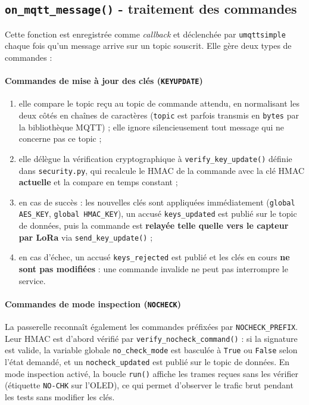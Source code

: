 \documentclass[a4paper,11pt]{report}
\begin{document}
\subsection{\texttt{on\_mqtt\_message()} - traitement des commandes}
Cette fonction est enregistrée comme \emph{callback} et déclenchée par \texttt{umqttsimple} chaque fois
qu'un message arrive sur un topic souscrit. Elle gère deux types de commandes :

\paragraph{Commandes de mise à jour des clés (\texttt{KEYUPDATE})}
\begin{enumerate}
    \item elle compare le topic reçu au topic de commande attendu, en normalisant les deux côtés en
    chaînes de caractères (\texttt{topic} est parfois transmis en \texttt{bytes} par la bibliothèque MQTT) ;
    elle ignore silencieusement tout message qui ne concerne pas ce topic ;
    \item elle délègue la vérification cryptographique à \texttt{verify\_key\_update()} définie dans
    \texttt{security.py}, qui recalcule le HMAC de la commande avec la clé HMAC \textbf{actuelle} et la
    compare en temps constant ;
    \item en cas de succès : les nouvelles clés sont appliquées immédiatement (\texttt{global AES\_KEY},
    \texttt{global HMAC\_KEY}), un accusé \texttt{keys\_updated} est publié sur le topic de données, puis
    la commande est \textbf{relayée telle quelle vers le capteur par LoRa} via \texttt{send\_key\_update()} ;
    \item en cas d'échec, un accusé \texttt{keys\_rejected} est publié et les clés en cours
    \textbf{ne sont pas modifiées} : une commande invalide ne peut pas interrompre le service.
\end{enumerate}

\paragraph{Commandes de mode inspection (\texttt{NOCHECK})}
La passerelle reconnaît également les commandes préfixées par \texttt{NOCHECK\_PREFIX}. Leur HMAC est
d'abord vérifié par \texttt{verify\_nocheck\_command()} : si la signature est valide, la variable globale
\texttt{no\_check\_mode} est basculée à \texttt{True} ou \texttt{False} selon l'état demandé, et un
\texttt{nocheck\_updated} est publié sur le topic de données. En mode inspection activé, la boucle
\texttt{run()} affiche les trames reçues sans les vérifier (étiquette \texttt{NO-CHK} sur l'OLED), ce
qui permet d'observer le trafic brut pendant les tests sans modifier les clés.
\end{document}
